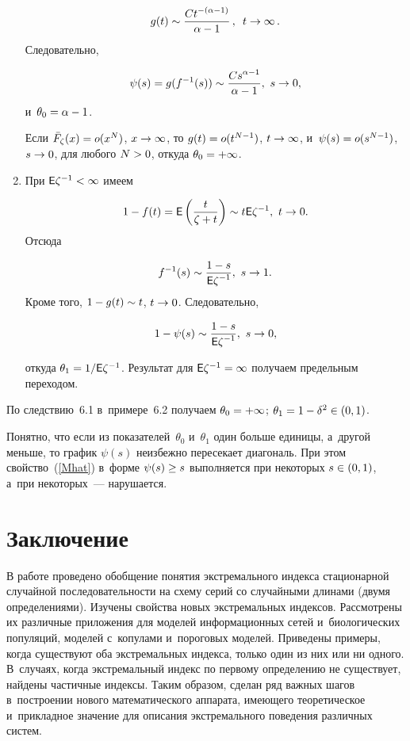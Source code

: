 \begin{multicols}{2}
\begin{enumerate}[(1)]
\noindent
$$
g(t)\sim \displaystyle\frac{\displaystyle Ct^{-(\alpha-1)}\mathstrut}{\displaystyle \alpha-1\mathstrut}\,,\enskip
t\to\infty\,.
$$
 Следовательно,
 
 \noindent
$$
\psi(s)=g(f^{-1}(s))\sim \displaystyle\frac{\displaystyle Cs^{\alpha-1}\mathstrut}{\displaystyle \alpha-1\mathstrut},\ s\to 0,
$$
и~$\theta_0\hm=\alpha\hm-1$.

Если ${\bar F}_\zeta(x)\hm=o(x^N)$, $x\hm\to\infty$, то $g(t)\hm=o(t^{N-1})$,
$t\hm\to\infty$, и~$\psi(s)\hm=o(s^{N-1})$,
$s\hm\to 0$, для любого $N\hm>0$, откуда $\theta_0\hm=+\infty$.
\item
При ${\sf E}\zeta^{-1}\hm<\infty$ имеем

\noindent
$$
1-f(t)={\sf E}\left(\displaystyle\frac{\displaystyle t\mathstrut}{\displaystyle \zeta+t\mathstrut}\right)\sim t{\sf E}\zeta^{-1},\ t\to 0.
$$
 Отсюда
 
 \noindent
$$
f^{-1}(s)\sim \displaystyle\frac{\displaystyle 1-s\mathstrut}{\displaystyle {\sf E}\zeta^{-1}\mathstrut},\ s\to 1.
$$ 
Кроме того,
$1\hm-g(t)\sim t$, $t\hm\to 0$. Следовательно,


\noindent
$$
1-\psi(s)\sim \displaystyle\frac{\displaystyle 1-s\mathstrut}{\displaystyle {\sf E}\zeta^{-1}\mathstrut},\ s\to 0,
$$

\noindent
откуда
$\theta_1\hm=1/{\sf E}\zeta^{-1}$. Результат для
${\sf E}\zeta^{-1}\hm=\infty$ получаем предельным переходом.
\end{enumerate}


По следствию~6.1 в~примере~6.2 получаем $\theta_0\hm=+\infty$;
$\theta_1\hm=1\hm-\delta^2\hm\in (0,1)$.

Понятно, что если из показателей~$\theta_0$ и~$\theta_1$ один больше единицы,
а~другой меньше,
то график $\psi(s)$ неизбежно пересекает диагональ. При этом свойство~(\ref{Mhat})
в~форме $\psi(s)\hm\ge s$ выполняется при некоторых $s\hm\in (0,1)$,
а~при некоторых~--- нарушается.

\vspace*{-9pt}

\section{Заключение}

\vspace*{-2pt}

В работе проведено
обобщение понятия экстремального индекса стационарной случайной последовательности
на схему серий со случайными длинами (двумя определениями). Изучены свойства новых
экстремальных индексов. Рассмотрены их различные приложения для моделей
информационных сетей и~биологических популяций, моделей с~копулами
и~пороговых моделей. Приведены примеры, когда
существуют оба экстремальных индекса, только один из них или ни одного. В~случаях,
когда экстремальный индекс по первому определению не существует, найдены
частичные индексы.
Таким образом, сделан ряд важных шагов в~построении нового математического
аппарата, имеющего
теоретическое и~прикладное значение для описания экстремального поведения
различных систем.


\end{multicols}
